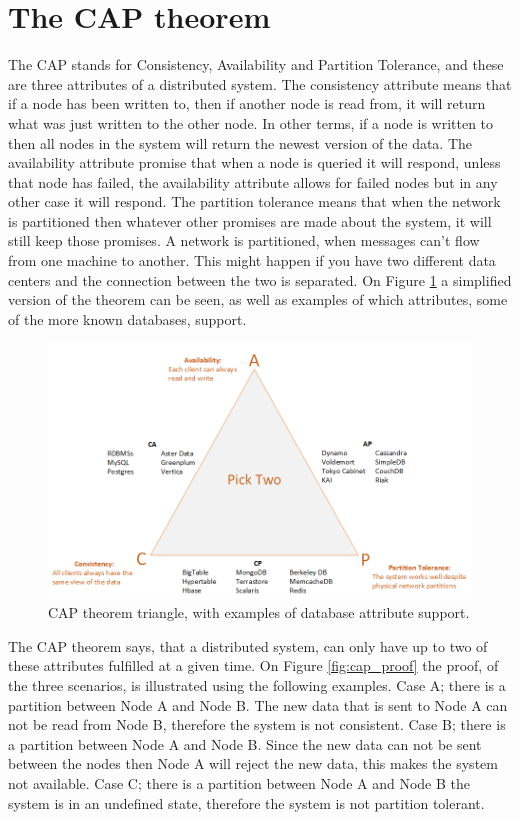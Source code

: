\section{The CAP theorem}
The CAP stands for Consistency, Availability and Partition Tolerance, and these are three attributes of a distributed system. The consistency attribute means that if a node has been written to, then if another node is read from, it will return what was just written to the other node. In other terms, if a node is written to then all nodes in the system  will return the newest version of the data. The availability attribute promise that when a node is queried it will respond, unless that node has failed, the availability attribute allows for failed nodes but in any other case it will respond. The partition tolerance means that when the network is partitioned then whatever other promises are made about the system, it will still keep those promises. A network is partitioned, when messages can't flow from one machine to another. This might happen if you have two different data centers and the connection between the two is separated. On Figure \ref{fig:cap_triangle} a simplified version of the theorem can be seen, as well as examples of which attributes, some  of the more known databases, support.

\begin{figure}[h!]
	\centering
	\includegraphics[width=0.61\linewidth]{consistency/fig/cap_triangle.png}
	\caption{CAP theorem triangle, with examples of database attribute support.}
	\label{fig:cap_triangle}
\end{figure}

The CAP theorem says, that a distributed system, can only have up to two of these attributes fulfilled at a given time. On Figure \ref{fig:cap_proof} the proof, of the three scenarios, is illustrated using the following examples. Case A; there is a partition between Node A and Node B. The new data that is sent to Node A can not be read from Node B, therefore the system is not consistent. Case B; there is a partition between Node A and Node B. Since the new data can not be sent between the nodes then Node A will reject the new data, this makes the system not available. Case C; there is a partition between Node A and Node B the system is in an undefined state, therefore the system is not partition tolerant.

